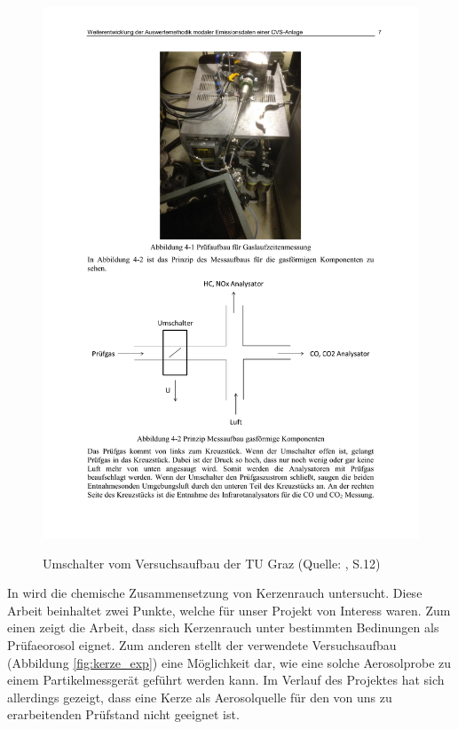 \begin{figure}[H]
	\myfloatalign
	{\includegraphics[width=.9\linewidth]{gfx/related/graz_ventil.pdf}} \quad
	\caption[Umschalter vom Versuchsaufbau der TU Graz (Quelle: \cite{auswertemethodik}, S.12)]
	{Umschalter vom Versuchsaufbau der TU Graz (Quelle: \cite{auswertemethodik}, S.12)}
	\label{fig:umschalter_graz}
\end{figure}

In \cite{candle} wird die chemische Zusammensetzung von Kerzenrauch untersucht. Diese Arbeit beinhaltet zwei Punkte, welche f\"{u}r unser Projekt von Interess waren. Zum einen zeigt die Arbeit, dass sich Kerzenrauch unter bestimmten Bedinungen als Pr\"{u}faeorosol eignet. Zum anderen stellt der verwendete Versuchsaufbau (Abbildung \ref{fig:kerze_exp}) eine M\"{o}glichkeit dar, wie eine solche Aerosolprobe zu einem Partikelmessger\"{a}t gef\"{u}hrt werden kann. Im Verlauf des Projektes hat sich allerdings gezeigt, dass eine Kerze als Aerosolquelle f\"{u}r den von uns zu erarbeitenden Pr\"{u}fstand nicht geeignet ist.

